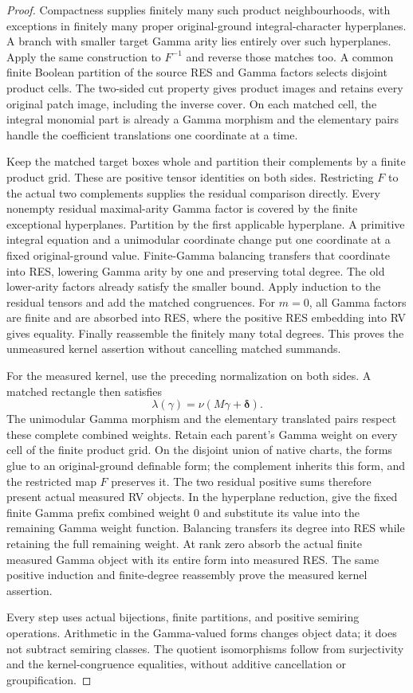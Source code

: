 \documentclass[12pt]{amsart}
\theoremstyle{plain}
\theoremstyle{definition}
\theoremstyle{remark}
\numberwithin{equation}{section}
\theoremstyle{plain}
\newcommand{\0}{\emptyset}
\begin{document}
\begin{proof}
Compactness supplies finitely many such product neighbourhoods, with
exceptions in finitely many proper original-ground integral-character
hyperplanes. A branch with smaller target Gamma arity lies entirely
over such hyperplanes. Apply the same construction to $F^{-1}$ and
reverse those matches too. A common finite Boolean partition of the
source RES and Gamma factors selects disjoint product cells. The
two-sided cut property gives product images and retains every original
patch image, including the inverse cover. On each matched cell, the
integral monomial part is already a Gamma morphism and the elementary
pairs handle the coefficient translations one coordinate at a time.

Keep the matched target boxes whole and partition their complements by
a finite product grid. These are positive tensor identities on both
sides. Restricting $F$ to the actual two complements supplies the
residual comparison directly. Every nonempty residual maximal-arity
Gamma factor is covered by the finite exceptional hyperplanes.
Partition by the first applicable hyperplane. A primitive integral
equation and a unimodular coordinate change put one coordinate at a
fixed original-ground value. Finite-Gamma balancing transfers that
coordinate into RES, lowering Gamma arity by one and preserving total
degree. The old lower-arity factors already satisfy the smaller bound.
Apply induction to the residual tensors and add the matched congruences.
For $m=0$, all Gamma factors are finite and are absorbed into RES, where
the positive RES embedding into RV gives equality. Finally reassemble
the finitely many total degrees. This proves the unmeasured kernel
assertion without cancelling matched summands.

For the measured kernel, use the preceding normalization on both
sides. A matched rectangle then satisfies
\[
 \lambda(\gamma)=\nu(M\gamma+\boldsymbol\delta).
\]
The unimodular Gamma morphism and the elementary translated pairs
respect these complete combined weights. Retain each parent's Gamma
weight on every cell of the finite product grid. On the disjoint union
of native charts, the forms glue to an original-ground definable form;
the complement inherits this form, and the restricted map $F$ preserves
it. The two residual positive sums therefore present actual measured RV
objects. In the hyperplane reduction, give the fixed finite Gamma
prefix combined weight $0$ and substitute its value into the remaining
Gamma weight function. Balancing transfers its degree into RES while
retaining the full remaining weight. At rank zero absorb the actual
finite measured Gamma object with its entire form into measured RES.
The same positive induction and finite-degree reassembly prove the
measured kernel assertion.

Every step uses actual bijections, finite partitions, and positive
semiring operations. Arithmetic in the Gamma-valued forms changes
object data; it does not subtract semiring classes. The quotient
isomorphisms follow from surjectivity and the kernel-congruence
equalities, without additive cancellation or groupification.
\end{proof}
\end{document}
